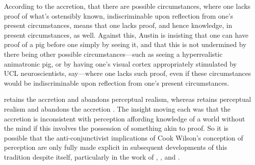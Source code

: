 \documentclass[12pt]{article}
\begin{document}
According to the accretion, that there are possible circumstances, where one lacks proof of what's ostensibly known, indiscriminable upon reflection from one's present circumstances, means that one lacks proof, and hence knowledge, in present circumstances, as well. Against this, Austin is insisting that one can have proof of a pig before one simply by seeing it, and that this is not undermined by there being other possible circumstances---such as seeing a hyperrealistic animatronic pig, or by having one's visual cortex appropriately stimulated by UCL neuroscientists, say---where one lacks such proof, even if these circumstances would be indiscriminable upon reflection from one's present circumstances.

\citet{Prichard:1938ve} retains the accretion and abandons perceptual realism, whereas \citet{Austin:1962lr} retains perceptual realism and abandons the accretion \citep[see][for discussion]{Kalderon:2010fk}. The insight moving each was that the accretion is inconsistent with perception affording knowledge of a world without the mind if this involves the possession of something akin to proof. So it is possible that the anti-conjunctivist implications of Cook Wilson's conception of perception are only fully made explicit in subsequent developments of this tradition despite itself, particularly in the work of \citet{Prichard:1938ve}, \citet{Austin:1962lr}, and \cite{Hinton:1973js}.


\nocite{Hobbes:1651fk}

 
 
\end{document}
